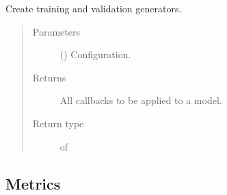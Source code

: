 \documentclass[letterpaper,10pt,english]{sphinxmanual}
\begin{document}

\begin{fulllineitems}
\label{\detokenize{engine/init:engine.build_callbacks}}
Create training and validation generators.
\begin{quote}\begin{description}
\item[{Parameters}] \leavevmode
{} () \textendash{} Configuration.

\item[{Returns}] \leavevmode
{} \textendash{} All callbacks to be applied to a model.

\item[{Return type}] \leavevmode
{} of 

\end{description}\end{quote}

\end{fulllineitems}



\subsection{Metrics}
\label{\detokenize{engine/metrics:module-engine.metrics}}\label{\detokenize{engine/metrics:metrics}}\label{\detokenize{engine/metrics::doc}}
\end{document}
